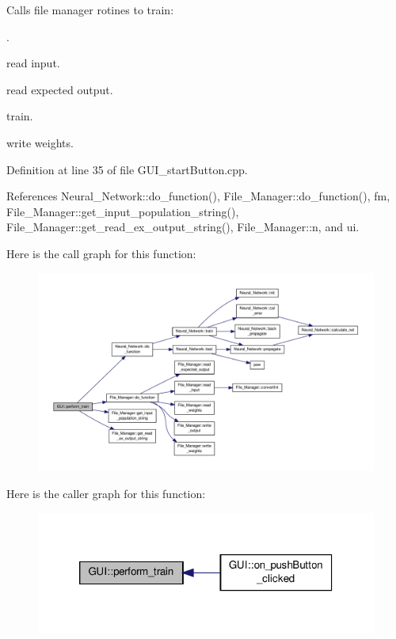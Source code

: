 Calls file manager rotines to train\-:\par
. 


\begin{DoxyEnumerate}
\item read input.\par

\item read expected output.\par

\item train.\par

\item write weights. 
\end{DoxyEnumerate}

Definition at line 35 of file G\-U\-I\-\_\-start\-Button.\-cpp.



References Neural\-\_\-\-Network\-::do\-\_\-function(), File\-\_\-\-Manager\-::do\-\_\-function(), fm, File\-\_\-\-Manager\-::get\-\_\-input\-\_\-population\-\_\-string(), File\-\_\-\-Manager\-::get\-\_\-read\-\_\-ex\-\_\-output\-\_\-string(), File\-\_\-\-Manager\-::n, and ui.



Here is the call graph for this function\-:\nopagebreak
\begin{figure}[H]
\begin{center}
\leavevmode
\includegraphics[width=350pt]{d7/d46/a00002_ad1bb069dee02010a61045c91f5e7752f_cgraph}
\end{center}
\end{figure}




Here is the caller graph for this function\-:\nopagebreak
\begin{figure}[H]
\begin{center}
\leavevmode
\includegraphics[width=320pt]{d7/d46/a00002_ad1bb069dee02010a61045c91f5e7752f_icgraph}
\end{center}
\end{figure}


